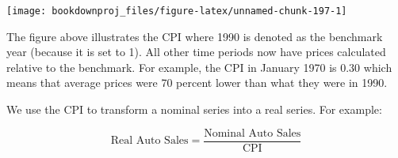 \documentclass[
]{book}
\newenvironment{Shaded}{\begin{snugshade}}{\end{snugshade}}
\newcommand{\AttributeTok}[1]{\textcolor[rgb]{0.13,0.29,0.53}{#1}}
\newcommand{\ConstantTok}[1]{\textcolor[rgb]{0.56,0.35,0.01}{#1}}
\newcommand{\DecValTok}[1]{\textcolor[rgb]{0.00,0.00,0.81}{#1}}
\newcommand{\FunctionTok}[1]{\textcolor[rgb]{0.13,0.29,0.53}{\textbf{#1}}}
\newcommand{\NormalTok}[1]{#1}
\newcommand{\OtherTok}[1]{\textcolor[rgb]{0.56,0.35,0.01}{#1}}
\newcommand{\SpecialCharTok}[1]{\textcolor[rgb]{0.81,0.36,0.00}{\textbf{#1}}}
\newcommand{\StringTok}[1]{\textcolor[rgb]{0.31,0.60,0.02}{#1}}
\begin{document}
\begin{Shaded}
\end{Shaded}

\begin{center}\texttt{[image: bookdownproj\_files/figure-latex/unnamed-chunk-197-1]} \end{center}

The figure above illustrates the CPI where 1990 is denoted as the benchmark year (because it is set to 1). All other time periods now have prices calculated relative to the benchmark. For example, the CPI in January 1970 is \(0.30\) which means that average prices were 70 percent lower than what they were in 1990.

We use the CPI to transform a nominal series into a real series. For example:

\[\mbox{Real Auto Sales} = \frac{\mbox{Nominal Auto Sales}}{\mbox{CPI}}\]
\end{document}

